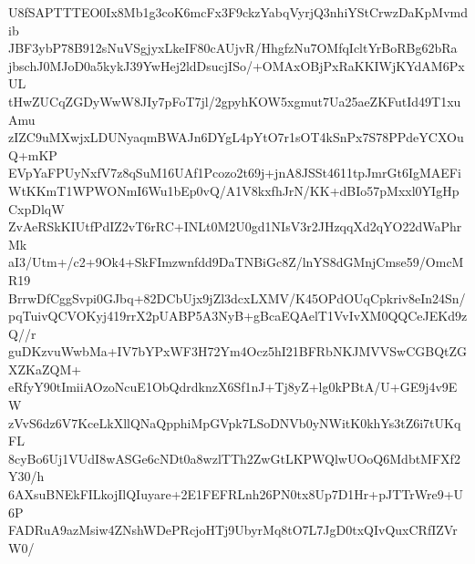 U8fSAPTTTEO0Ix8Mb1g3coK6mcFx3F9ckzYabqVyrjQ3nhiYStCrwzDaKpMvmdib
JBF3ybP78B912sNuVSgjyxLkeIF80cAUjvR/HhgfzNu7OMfqIcltYrBoRBg62bRa
jbschJ0MJoD0a5kykJ39YwHej2ldDsucjISo/+OMAxOBjPxRaKKIWjKYdAM6PxUL
tHwZUCqZGDyWwW8JIy7pFoT7jl/2gpyhKOW5xgmut7Ua25aeZKFutId49T1xuAmu
zIZC9uMXwjxLDUNyaqmBWAJn6DYgL4pYtO7r1sOT4kSnPx7S78PPdeYCXOuQ+mKP
EVpYaFPUyNxfV7z8qSuM16UAf1Pcozo2t69j+jnA8JSSt4611tpJmrGt6IgMAEFi
WtKKmT1WPWONmI6Wu1bEp0vQ/A1V8kxfhJrN/KK+dBIo57pMxxl0YIgHpCxpDlqW
ZvAeRSkKIUtfPdIZ2vT6rRC+INLt0M2U0gd1NIsV3r2JHzqqXd2qYO22dWaPhrMk
aI3/Utm+/c2+9Ok4+SkFImzwnfdd9DaTNBiGc8Z/lnYS8dGMnjCmse59/OmcMR19
BrrwDfCggSvpi0GJbq+82DCbUjx9jZl3dcxLXMV/K45OPdOUqCpkriv8eIn24Sn/
pqTuivQCVOKyj419rrX2pUABP5A3NyB+gBcaEQAelT1VvIvXM0QQCeJEKd9zQ//r
guDKzvuWwbMa+IV7bYPxWF3H72Ym4Ocz5hI21BFRbNKJMVVSwCGBQtZGXZKaZQM+
eRfyY90tImiiAOzoNcuE1ObQdrdknzX6Sf1nJ+Tj8yZ+lg0kPBtA/U+GE9j4v9EW
zVvS6dz6V7KceLkXllQNaQpphiMpGVpk7LSoDNVb0yNWitK0khYs3tZ6i7tUKqFL
8cyBo6Uj1VUdI8wASGe6cNDt0a8wzlTTh2ZwGtLKPWQlwUOoQ6MdbtMFXf2Y30/h
6AXsuBNEkFILkojIlQIuyare+2E1FEFRLnh26PN0tx8Up7D1Hr+pJTTrWre9+U6P
FADRuA9azMsiw4ZNshWDePRcjoHTj9UbyrMq8tO7L7JgD0txQIvQuxCRfIZVrW0/
